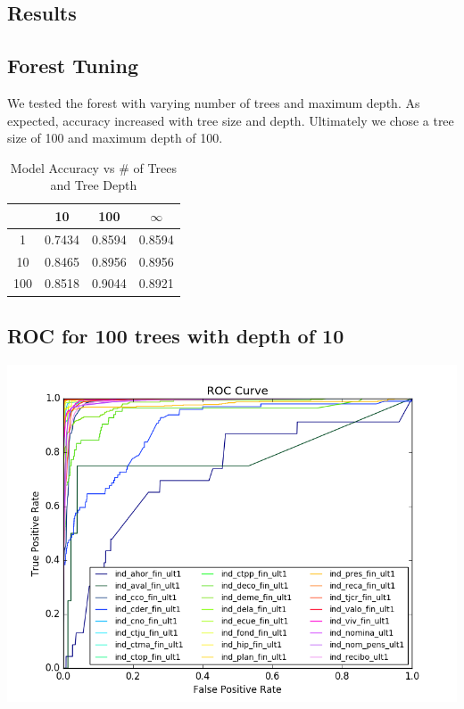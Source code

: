 \documentclass{article}
\begin{document}
\begin{spacing}{1}
\begin{large}
\subsection{Results}

\subsection{Forest Tuning}

We tested the forest with varying number of trees and maximum depth. As expected, accuracy increased with tree size and depth. Ultimately we chose a tree size of 100 and maximum depth of 100.
\begin{table}[h]
	\centering
	\begin{tabular}{|c|c|c|c|}
		\hline
		\backslashbox{Trees}{Depth} & 10 & 100 & $\infty$ \\
		\hline
		1 & 0.7434 & 0.8594  & 0.8594 \\
		10 & 0.8465 & 0.8956  & 0.8956 \\
		100 & 0.8518 & 0.9044  & 0.8921 \\
		\hline
	\end{tabular}
	\caption{Model Accuracy vs \# of Trees and Tree Depth}
	\label{tab:my_label}
\end{table}


\subsection{ROC for 100 trees with depth of 10}
\begin{center}
	\includegraphics[width = 15cm]{ROC.png}
\end{center}


\end{large}
\end{spacing}
\end{document}
